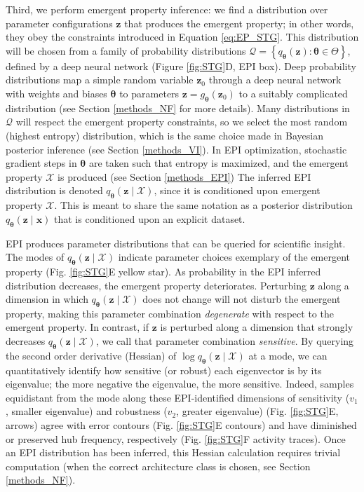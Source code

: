 \documentclass[11pt]{article}
\begin{document}
Third, we perform emergent property inference: we find a distribution over parameter configurations $\mathbf{z}$ that produces the emergent property; in other words, they obey the constraints introduced in Equation \ref{eq:EP_STG}.  
This distribution will be chosen from a family of probability distributions $\mathcal{Q} = \left\{ q_{\bm{\theta}}(\mathbf{z}) : \bm{\theta} \in \Theta \right\}$, defined by a deep neural network \cite{rezende2015variational, dinh2017density, papamakarios2017masked} (Figure \ref{fig:STG}D, EPI box).
Deep probability distributions map a simple random variable $\mathbf{z}_0$ through a deep neural network with weights and biases $\bm{\theta}$ to parameters $\mathbf{z} = g_{\bm{\theta}}(\mathbf{z}_0)$ to a suitably complicated distribution (see Section \ref{methods_NF} for more details).
Many distributions in $\mathcal{Q}$ will respect the emergent property constraints, so we select the most random (highest entropy) distribution, which is the same choice made in Bayesian posterior inference (see Section \ref{methods_VI}).
In EPI optimization, stochastic gradient steps in $\bm{\theta}$ are taken such that entropy is maximized, and the emergent property $\mathcal{X}$ is produced (see Section \ref{methods_EPI})
The inferred EPI distribution is denoted $q_{\bm{\theta}}(\mathbf{z} \mid \mathcal{X})$, since it is conditioned upon emergent property $\mathcal{X}$. 
This is meant to share the same notation as a posterior distribution $q_{\bm{\theta}}(\mathbf{z} \mid \mathbf{x})$ that is conditioned upon an explicit dataset.

EPI produces parameter distributions that can be queried for scientific insight.
The modes of $q_{\bm{\theta}}(\mathbf{z} \mid \mathcal{X})$ indicate parameter choices exemplary of the emergent property (Fig. \ref{fig:STG}E yellow star).
As probability in the EPI inferred distribution decreases, the emergent property deteriorates.
Perturbing $\mathbf{z}$ along a dimension in which $q_{\bm{\theta}}(\mathbf{z} \mid \mathcal{X})$ does not change will not disturb the emergent property, making this parameter combination \emph{degenerate} with respect to the emergent property.
In contrast, if $\mathbf{z}$ is perturbed along a dimension that strongly decreases $q_{\bm{\theta}}(\mathbf{z} \mid \mathcal{X})$, we call that parameter combination \emph{sensitive}.
By querying the second order derivative (Hessian) of $\log q_{\bm{\theta}}(\mathbf{z} \mid \mathcal{X})$ at a mode, we can quantitatively identify how sensitive (or robust) each eigenvector is by its eigenvalue; the more negative the eigenvalue, the more sensitive.
Indeed, samples equidistant from the mode along these EPI-identified dimensions of sensitivity ($v_1$, smaller eigenvalue) and robustness ($v_2$, greater eigenvalue) (Fig. \ref{fig:STG}E, arrows) agree with error contours (Fig. \ref{fig:STG}E contours) and have diminished or preserved hub frequency, respectively (Fig. \ref{fig:STG}F activity traces).
Once an EPI distribution has been inferred, this Hessian calculation requires trivial computation (when the correct architecture class is chosen, see Section \ref{methods_NF}).
\end{document}
